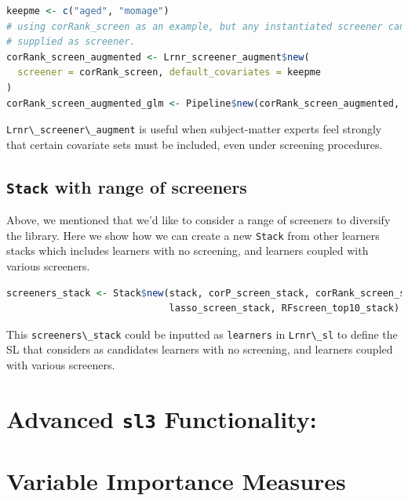 \documentclass[
  12pt, krantz2,
]{krantz}
\newcommand{\passthrough}[1]{#1}
\newcommand{\1}{\mathbbm{1}}
\theoremstyle{definition}
\theoremstyle{definition}
\theoremstyle{definition}
\theoremstyle{definition}
\theoremstyle{remark}
\begin{document}
\begin{lstlisting}[language=R]
keepme <- c("aged", "momage")
# using corRank_screen as an example, but any instantiated screener can be 
# supplied as screener.
corRank_screen_augmented <- Lrnr_screener_augment$new(
  screener = corRank_screen, default_covariates = keepme
)
corRank_screen_augmented_glm <- Pipeline$new(corRank_screen_augmented, lrn_glm)
\end{lstlisting}

\passthrough{\lstinline!Lrnr\_screener\_augment!} is useful when subject-matter experts feel strongly
that certain covariate sets must be included, even under screening procedures.

\hypertarget{stack-with-range-of-screeners}{%
\subsection{\texorpdfstring{\texttt{Stack} with range of screeners}{Stack with range of screeners}}\label{stack-with-range-of-screeners}}

Above, we mentioned that we'd like to consider a range of screeners to
diversify the library. Here we show how we can create a new \passthrough{\lstinline!Stack!} from other
learners stacks which includes learners with no screening, and learners coupled
with various screeners.

\begin{lstlisting}[language=R]
screeners_stack <- Stack$new(stack, corP_screen_stack, corRank_screen_stack, 
                             lasso_screen_stack, RFscreen_top10_stack)
\end{lstlisting}

This \passthrough{\lstinline!screeners\_stack!} could be inputted as \passthrough{\lstinline!learners!} in \passthrough{\lstinline!Lrnr\_sl!} to
define the SL that considers as candidates learners with no screening, and
learners coupled with various screeners.

\hypertarget{advanced-sl3-functionality}{%
\section*{\texorpdfstring{Advanced \texttt{sl3} Functionality:}{Advanced sl3 Functionality:}}\label{advanced-sl3-functionality}}


\hypertarget{variable-importance-measures}{%
\section{Variable Importance Measures}\label{variable-importance-measures}}
\end{document}
